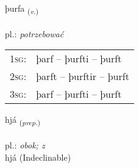 \documentclass[frontgrid, backgrid]{flacards}\usepackage[]{graphicx}\usepackage[]{xcolor}
\begin{document}
\renewcommand{\flhead}{\vskip5pt \fboxsep=0pt {\small\bfseries\footnotesize Sagnorð | czasownik}}
\renewcommand{\fcfoot}{\vskip5pt \fboxsep=0pt \hspace{2pt}{\small\bfseries\footnotesize 1K}}

\renewcommand{\blhead}{\vskip5pt {\small\bfseries\footnotesize Sagnorð | czasownik }}
\renewcommand{\bcfoot}{\vskip5pt \hspace{2pt}{\small\bfseries\footnotesize 1K}}


{þurfa \small{\textsubscript{(\textit{v.})}} \\[1ex] %
\textphonetic{[θʏrva]} \\
pl.: \emph{potrzebować} \\  [2ex]
\renewcommand*{\arraystretch}{0.8}
\begin{tabular}{p{1cm}l}
\textsc{1sg}: & þarf -- þurfti -- þurft \\ 
\textsc{2sg}: & þarft -- þurftir -- þurft \\ 
\textsc{3sg}: & þarf -- þurfti -- þurft \\ 
\end{tabular}
}


\renewcommand{\flhead}{\vskip5pt \fboxsep=0pt {\small\bfseries\footnotesize Forsetning | przyimek}}
\renewcommand{\fcfoot}{\vskip5pt \fboxsep=0pt \hspace{2pt}{\small\bfseries\footnotesize 1K}}

\renewcommand{\blhead}{\vskip5pt {\small\bfseries\footnotesize Forsetning | przyimek }}
\renewcommand{\bcfoot}{\vskip5pt \hspace{2pt}{\small\bfseries\footnotesize 1K}}


{hjá \small{\textsubscript{(\textit{prep.})}} \\[1ex]
\textphonetic{[çauː]} \\
pl.: \emph{obok; z} \\  [2ex]
hjá (Indeclinable)}

\renewcommand{\flhead}{\vskip5pt \fboxsep=0pt {\small\bfseries\footnotesize Nafnorð | rzeczownik}}
\renewcommand{\fcfoot}{\vskip5pt \fboxsep=0pt \hspace{2pt}{\small\bfseries\footnotesize 1K}}
\end{document}

